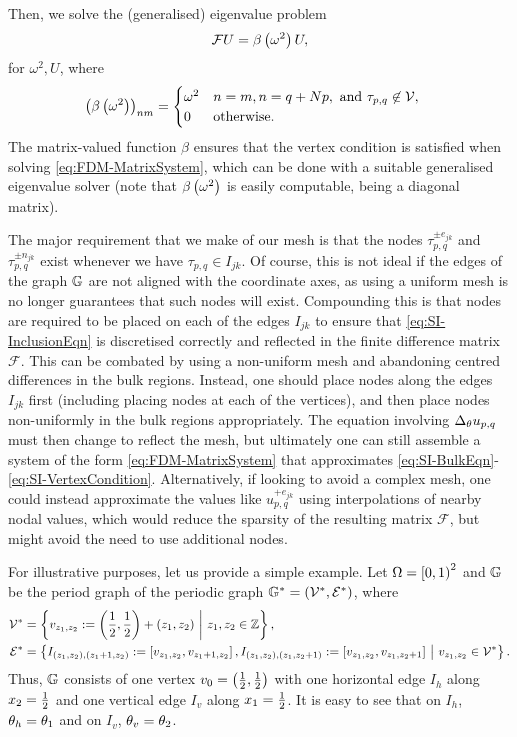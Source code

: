Then, we solve the (generalised) eigenvalue problem
\begin{align} \label{eq:FDM-MatrixSystem}
	\mathcal{F}U = \beta\left( \omega^2 \right)U,
\end{align}
for $\omega^2, U$, where 
\begin{align*}
	\left( \beta\left( \omega^2 \right) \right)_{nm} &= 
	\begin{cases}
 		\omega^2 & n=m, n=q + Np, \text{ and } \tau_{p,q}\not\in\mathcal{V}, \\
 		0 & \text{otherwise. }
	\end{cases}
\end{align*}
The matrix-valued function $\beta$ ensures that the vertex condition is satisfied when solving \eqref{eq:FDM-MatrixSystem}, which can be done with a suitable generalised eigenvalue solver (note that $\beta\left( \omega^2 \right)$ is easily computable, being a diagonal matrix).

The major requirement that we make of our mesh is that the nodes $\tau_{p,q}^{\pm e_{jk}}$ and $\tau_{p,q}^{\pm n_{jk}}$ exist whenever we have $\tau_{p,q}\in I_{jk}$.
Of course, this is not ideal if the edges of the graph $\mathbb{G}$ are not aligned with the coordinate axes, as using a uniform mesh is no longer guarantees that such nodes will exist.
Compounding this is that nodes are required to be placed on each of the edges $I_{jk}$ to ensure that \eqref{eq:SI-InclusionEqn} is discretised correctly and reflected in the finite difference matrix $\mathcal{F}$.
This can be combated by using a non-uniform mesh and abandoning centred differences in the bulk regions.
Instead, one should place nodes along the edges $I_{jk}$ first (including placing nodes at each of the vertices), and then place nodes non-uniformly in the bulk regions appropriately.
The equation involving $\Delta_{\theta}u_{p,q}$ must then change to reflect the mesh, but ultimately one can still assemble a system of the form \eqref{eq:FDM-MatrixSystem} that approximates \eqref{eq:SI-BulkEqn}-\eqref{eq:SI-VertexCondition}.
Alternatively, if looking to avoid a complex mesh, one could instead approximate the values like $u_{p,q}^{+e_{jk}}$ using interpolations of nearby nodal values, which would reduce the sparsity of the resulting matrix $\mathcal{F}$, but might avoid the need to use additional nodes.

For illustrative purposes, let us provide a simple example.
Let $\Omega=\left[0,1\right)^2$ and $\mathbb{G}$ be the period graph of the periodic graph $\mathbb{G}^*=\left( \mathcal{V}^*,\mathcal{E}^* \right)$, where
\begin{align*}
	\mathcal{V}^* &= \left\{  v_{z_1,z_2} := \left( \frac{1}{2},\frac{1}{2} \right) + \left( z_1,z_2 \right) \ \middle\vert \  z_1,z_2\in\mathbb{Z}  \right\}, \\
	\mathcal{E}^* &= \left\{  I_{(z_1,z_2),(z_1+1,z_2)} := \left[  v_{z_1,z_2}, v_{z_1+1,z_2}  \right], I_{(z_1,z_2),(z_1,z_2+1)} := \left[  v_{z_1,z_2}, v_{z_1,z_2+1}  \right] \ \middle\vert \  v_{z_1,z_2}\in\mathcal{V}^*  \right\}.
\end{align*}
Thus, $\mathbb{G}$ consists of one vertex $v_0=\left( \frac{1}{2},\frac{1}{2} \right)$ with one horizontal edge $I_h$ along $x_2=\frac{1}{2}$ and one vertical edge $I_v$ along $x_1=\frac{1}{2}$.
It is easy to see that on $I_h$, $\theta_h = \theta_1$ and on $I_v$, $\theta_v = \theta_2$.

